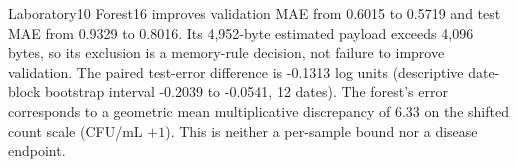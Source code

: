 Laboratory10 Forest16 improves validation MAE from 0.6015 to 0.5719 and test MAE from 0.9329 to 0.8016. Its 4,952-byte estimated payload exceeds 4,096 bytes, so its exclusion is a memory-rule decision, not failure to improve validation. The paired test-error difference is -0.1313 log units (descriptive date-block bootstrap interval -0.2039 to -0.0541, 12 dates). The forest's error corresponds to a geometric mean multiplicative discrepancy of 6.33 on the shifted count scale (CFU/mL $+1$). This is neither a per-sample bound nor a disease endpoint.